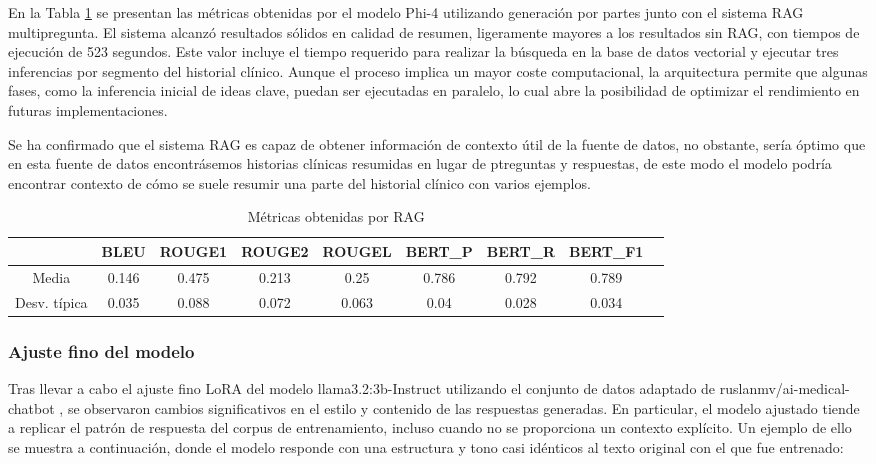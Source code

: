 \documentclass[../main.tex]{subfiles}
\begin{document}
En la Tabla \ref{tab:metricas_RAG} se presentan las métricas obtenidas por el modelo Phi-4 utilizando generación por partes junto con el sistema RAG multipregunta. El sistema alcanzó resultados sólidos en calidad de resumen, ligeramente mayores a los resultados sin RAG, con tiempos de ejecución de 523 segundos. Este valor incluye el tiempo requerido para realizar la búsqueda en la base de datos vectorial y ejecutar tres inferencias por segmento del historial clínico. Aunque el proceso implica un mayor coste computacional, la arquitectura permite que algunas fases, como la inferencia inicial de ideas clave, puedan ser ejecutadas en paralelo, lo cual abre la posibilidad de optimizar el rendimiento en futuras implementaciones.

Se ha confirmado que el sistema RAG es capaz de obtener información de contexto útil de la fuente de datos, no obstante, sería óptimo que en esta fuente de datos encontrásemos historias clínicas resumidas en lugar de ptreguntas y respuestas, de este modo el modelo podría encontrar contexto de cómo se suele resumir una parte del historial clínico con varios ejemplos.
\begin{table}[H]
	\centering
	\caption{Métricas obtenidas por RAG}
	\label{tab:metricas_RAG}
	\renewcommand{\arraystretch}{1.2}
	\begin{tabular}{c|cccccccc}
		\hline
		& \textbf{BLEU} & \textbf{ROUGE1} & \textbf{ROUGE2} & \textbf{ROUGEL} & \textbf{BERT\_P} & \textbf{BERT\_R} & \textbf{BERT\_F1} \\
		\hline
		Media & 0.146 & 0.475 & 0.213 & 0.25 & 0.786 & 0.792 & 0.789 \\
		Desv. típica & 0.035 & 0.088 & 0.072 & 0.063 & 0.04 & 0.028 & 0.034 \\
		\hline
	\end{tabular}
	
\end{table}
\subsubsection{Ajuste fino del modelo}
Tras llevar a cabo el ajuste fino LoRA del modelo llama3.2:3b-Instruct utilizando el conjunto de datos adaptado de ruslanmv/ai-medical-chatbot  \parencite{ruslanmv2024aimedchatbot}, se observaron cambios significativos en el estilo y contenido de las respuestas generadas. En particular, el modelo ajustado tiende a replicar el patrón de respuesta del corpus de entrenamiento, incluso cuando no se proporciona un contexto explícito. Un ejemplo de ello se muestra a continuación, donde el modelo responde con una estructura y tono casi idénticos al texto original con el que fue entrenado:
\end{document}
